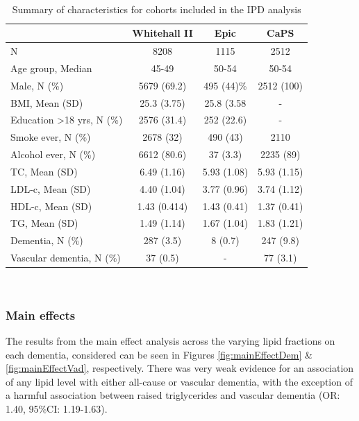 \documentclass[a4paper, twoside]{templates/ociamthesis}
\begin{document}
~





\begin{table}[H]

\caption[Summary of characteristics of IPD cohorts]{\label{tab:covariateSummary-table}Summary of characteristics for cohorts included in the IPD analysis}
\centering
\begin{tabular}[t]{>{}lccc}
\toprule
\textbf{ } & \textbf{Whitehall II} & \textbf{Epic} & \textbf{CaPS}\\
\midrule
N & 8208 & 1115 & 2512\\
\midrule
Age group, Median & 45-49 & 50-54 & 50-54\\
\midrule
Male, N (\%) & 5679 (69.2) & 495 (44)\% & 2512 (100)\\
\midrule
BMI, Mean (SD) & 25.3 (3.75) & 25.8 (3.58 & -\\
\midrule
Education >18 yrs, N (\%) & 2576 (31.4) & 252 (22.6) & -\\
\midrule
\addlinespace
Smoke ever, N (\%) & 2678 (32) & 490 (43) & 2110\\
\midrule
Alcohol ever, N (\%) & 6612 (80.6) & 37 (3.3) & 2235 (89)\\
\midrule
TC, Mean (SD) & 6.49 (1.16) & 5.93 (1.08) & 5.93 (1.15)\\
\midrule
LDL-c, Mean (SD) & 4.40 (1.04) & 3.77 (0.96) & 3.74 (1.12)\\
\midrule
HDL-c, Mean (SD) & 1.43 (0.414) & 1.43 (0.41) & 1.37 (0.41)\\
\midrule
\addlinespace
TG, Mean (SD) & 1.49 (1.14) & 1.67 (1.04) & 1.83 (1.21)\\
\midrule
Dementia, N (\%) & 287 (3.5) & 8 (0.7) & 247 (9.8)\\
\midrule
Vascular dementia, N (\%) & 37 (0.5) & - & 77 (3.1)\\
\bottomrule
\end{tabular}
\end{table}

~

\hypertarget{main-effects}{%
\subsubsection{Main effects}\label{main-effects}}

The results from the main effect analysis across the varying lipid fractions on each dementia, considered can be seen in Figures \ref{fig:mainEffectDem} \& \ref{fig:mainEffectVad}, respectively. There was very weak evidence for an association of any lipid level with either all-cause or vascular dementia, with the exception of a harmful association between raised triglycerides and vascular dementia (OR: 1.40, 95\%CI: 1.19-1.63).
\end{document}
